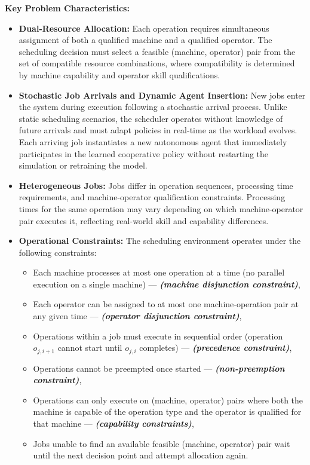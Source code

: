 \textbf{ Key Problem Characteristics:}
\begin{itemize}
\item \textbf{Dual-Resource Allocation:}
Each operation requires simultaneous assignment of both a qualified machine and a qualified operator. The scheduling decision must select a feasible (machine, operator) pair from the set of compatible resource combinations, where compatibility is determined by machine capability and operator skill qualifications.

\item \textbf{Stochastic Job Arrivals and Dynamic Agent Insertion:}
New jobs enter the system during execution following a stochastic arrival process. Unlike static scheduling scenarios, the scheduler operates without knowledge of future arrivals and must adapt policies in real-time as the workload evolves. Each arriving job instantiates a new autonomous agent that immediately participates in the learned cooperative policy without restarting the simulation or retraining the model.

\item \textbf{Heterogeneous Jobs:}
Jobs differ in operation sequences, processing time requirements, and machine-operator qualification constraints. Processing times for the same operation may vary depending on which machine-operator pair executes it, reflecting real-world skill and capability differences.

\item \textbf{Operational Constraints:}
The scheduling environment operates under the following constraints:

\begin{itemize}
    \item Each machine processes at most one operation at a time (no parallel execution on a single machine) — \textit{\textbf{(machine disjunction constraint)}},
    \item Each operator can be assigned to at most one machine-operation pair at any given time — \textit{\textbf{(operator disjunction constraint)}},
    \item Operations within a job must execute in sequential order (operation \( o_{j,i+1} \) cannot start until \( o_{j,i} \) completes) — \textit{\textbf{(precedence constraint)}},
    \item Operations cannot be preempted once started — \textit{\textbf{(non-preemption constraint)}},
    \item Operations can only execute on (machine, operator) pairs where both the machine is capable of the operation type and the operator is qualified for that machine — \textit{\textbf{(capability constraints)}},
    \item Jobs unable to find an available feasible (machine, operator) pair wait until the next decision point and attempt allocation again.
\end{itemize}
\end{itemize}
